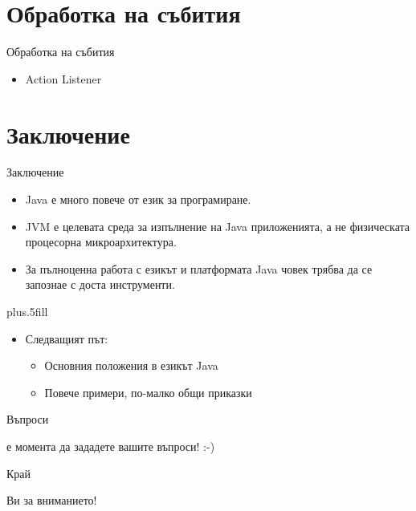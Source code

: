 \documentclass{beamer}
\begin{document}
\section{Обработка на събития}

\begin{frame}{Обработка на събития}
  \transdissolve
  \begin{itemize}
  \item Action Listener
  \end{itemize}
\end{frame}


\section*{Заключение}

\begin{frame}{Заключение}
  \transdissolve
  \begin{itemize}
  \item
    Java \alert{е много повече от език за програмиране}.
  \item
    JVM \alert{е целевата среда за изпълнение} на Java приложенията, а
    не физическата процесорна микроархитектура.
  \item
    За пълноценна работа с езикът и платформата Java човек трябва да
    се запознае с доста инструменти.
  \end{itemize}
  
  \vskip0pt plus.5fill
  \begin{itemize}
  \item
    Следващият път:
    \begin{itemize}
    \item
      Основния положения в езикът Java
    \item
      Повече примери, по-малко общи приказки
    \end{itemize}
  \end{itemize}
\end{frame}

\begin{frame}{Въпроси}
  \transdissolve
  \begin{center}
     е момента да зададете вашите въпроси! :-)
  \end{center}
\end{frame}

\begin{frame}{Край}
  \transdissolve
  \begin{center}
     Ви за вниманието!
  \end{center}
\end{frame}
\end{document}
